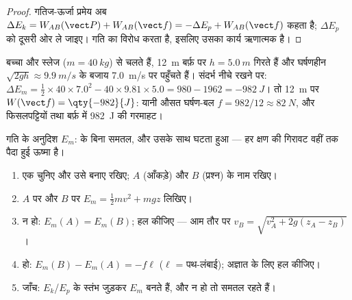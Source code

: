 \begin{proof}
गतिज-ऊर्जा प्रमेय अब $\Delta E_k = W_{AB}(\vect P) +
W_{AB}(\vect f) = -\Delta E_p + W_{AB}(\vect f)$ कहता है; $\Delta E_p$ को दूसरी ओर ले
जाइए।  गति का विरोध करता है, इसलिए उसका कार्य ऋणात्मक
है।
\end{proof}

\begin{example}[बर्फ़-गाड़ी का लेखा]\label{ex:g11:mechanical-energy:toboggan}
बच्चा और स्लेज ($m = \qty{40}{kg}$)  से चलते हैं, \qty{12}{m} बर्फ़ पर $h = \qty{5.0}{m}$ गिरते
हैं और घर्षणहीन $\sqrt{2gh} \approx \qty{9.9}{m/s}$ के बजाय \qty{7.0}{m/s} पर पहुँचते हैं। संदर्भ नीचे रखने पर:
$\Delta E_m = \tfrac12 \times 40 \times 7.0^2 - 40 \times 9.81
\times 5.0 = 980 - 1962 = \qty{-982}{J}$। तो \qty{12}{m} पर $W(\vect f) =
\qty{-982}{J}$: यानी औसत घर्षण-बल $f = 982/12 \approx \qty{82}{N}$,
और फिसलपट्टियों तथा बर्फ़ में \qty{982}{J} की गरमाहट।
\end{example}

\begin{omfigure}

{\small गति के अनुदिश $E_m$:  के बिना समतल, और उसके साथ
घटता हुआ --- हर क्षण की गिरावट वहीं तक पैदा हुई ऊष्मा है।}
\end{omfigure}

\begin{method}[ऊर्जा का बहीखाता]\label{met:g11:mechanical-energy:bookkeeping}
\begin{enumerate}
  \item एक  चुनिए और उसे बनाए रखिए; $A$ (आँकड़े) और
        $B$ (प्रश्न) के नाम रखिए।
  \item $A$ पर और $B$ पर $E_m = \tfrac12 mv^2 + mgz$ लिखिए।
  \item {} न हो: $E_m(A) = E_m(B)$; हल कीजिए --- आम तौर पर $v_B = \sqrt{v_A^2 + 2g(z_A - z_B)}$।
  \item {} हो: $E_m(B) - E_m(A) = -f\ell$ ($\ell$ = पथ-लंबाई); अज्ञात के लिए हल
        कीजिए।
  \item जाँच: $E_k$/$E_p$ के स्तंभ जुड़कर $E_m$ बनते हैं, और
         न हो तो समतल रहते हैं।
\end{enumerate}
\end{method}

